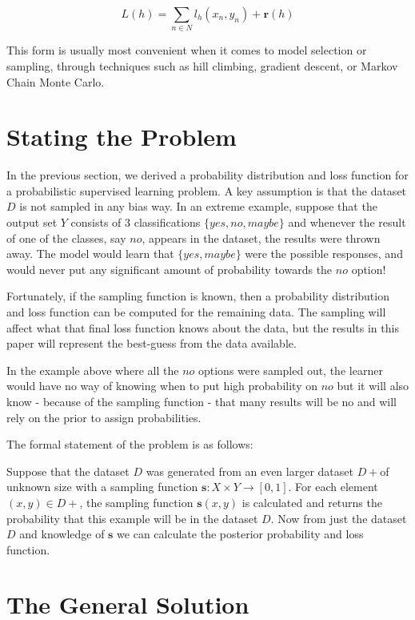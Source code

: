 \documentclass[twoside]{article}
\begin{document}
\[L(h)=\sum_{n \in N} l_h(x_n,y_n)+\mathbf{r}(h)\]

This form is usually most convenient when it comes to model selection or sampling, through techniques such as hill climbing, gradient descent, or Markov Chain Monte Carlo.

\section{Stating the Problem}

In the previous section, we derived a probability distribution and loss function for a probabilistic supervised learning problem. A key assumption is that the dataset \(D\) is not sampled in any bias way. In an extreme example, suppose that the output set \(Y\) consists of 3 classifications \(\{yes, no, maybe\}\) and whenever the result of one of the classes, say \(no\), appears in the dataset, the results were thrown away. The model would learn that \(\{yes, maybe\}\) were the possible responses, and would never put any significant amount of probability towards the \(no\) option!

Fortunately, if the sampling function is known, then a probability distribution and loss function can be computed for the remaining data. The sampling will affect what that final loss function knows about the data, but the results in this paper will represent the best-guess from the data available.

In the example above where all the \(no\) options were sampled out, the learner would have no way of knowing when to put high probability on \(no\) but it will also know - because of the sampling function - that many results will be no and will rely on the prior to assign probabilities.

The formal statement of the problem is as follows:

Suppose that the dataset \(D\) was generated from an even larger dataset \(D+\)of unknown size with a sampling function \(\mathbf{s}: X \times Y \rightarrow \left [ 0,1\right ]\). For each element \((x,y)\in D+\), the sampling function \(\mathbf{s}(x,y)\) is calculated and returns the probability that this example will be in the dataset  \(D\). Now from just the dataset \(D\) and knowledge of \(\mathbf{s}\) we can calculate the posterior probability and loss function.

\section{The General Solution}
\end{document}
